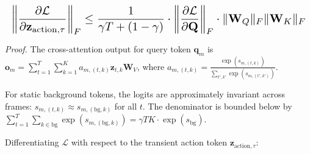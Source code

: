 \documentclass{article}
\begin{document}
\begin{equation}
\resizebox{\columnwidth}{!}{$\displaystyle
\begin{aligned}
\left\| \frac{\partial \mathcal{L}}{\partial \mathbf{z}_{\text{action}, \tau}} \right\|_F \le \frac{1}{\gamma T + (1 - \gamma)} \cdot \left\| \frac{\partial \mathcal{L}}{\partial \mathbf{Q}} \right\|_F \cdot \|\mathbf{W}_Q\|_F \|\mathbf{W}_K\|_F
\end{aligned}
$}
\end{equation}

























\textit{Proof.} The cross-attention output for query token $\mathbf{q}_m$ is $\mathbf{o}_m = \sum_{t=1}^T \sum_{k=1}^K a_{m, (t,k)} \mathbf{z}_{t, k} \mathbf{W}_V$, where $a_{m, (t,k)} = \frac{\exp(s_{m, (t,k)})}{\sum_{t', k'} \exp(s_{m, (t',k')})}$. 

For static background tokens, the logits are approximately invariant across frames: $s_{m, (t, k)} \approx s_{m, (\text{bg}, k)}$ for all $t$. The denominator is bounded below by $\sum_{t=1}^T \sum_{k \in \text{bg}} \exp(s_{m, (\text{bg}, k)}) = \gamma T K \cdot \exp(s_{\text{bg}})$. 

Differentiating $\mathcal{L}$ with respect to the transient action token $\mathbf{z}_{\text{action}, \tau}$:
\end{document}
